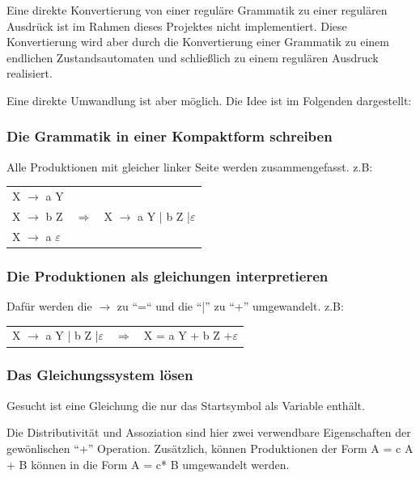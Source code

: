 Eine direkte Konvertierung von einer reguläre Grammatik zu einer regulären
Ausdrück ist im Rahmen dieses Projektes nicht implementiert. Diese Konvertierung
wird aber durch die Konvertierung einer Grammatik zu einem endlichen
Zustandsautomaten und schließlich zu einem regulären Ausdruck realisiert.

Eine direkte Umwandlung ist aber möglich. Die Idee ist im Folgenden dargestellt:
\subsubsection*{Die Grammatik in einer Kompaktform schreiben}
Alle Produktionen mit gleicher linker Seite werden zusammengefasst. z.B:

\begin{tabular}{lcr}

X $\rightarrow$ a Y & & \\
X $\rightarrow$ b Z & $\Longrightarrow$ & X $\rightarrow$ a Y | b Z
|$\varepsilon$\\
X $\rightarrow$ a $\varepsilon$ & &\\
 
\end{tabular}

\subsubsection*{Die Produktionen als gleichungen interpretieren}

Dafür werden die $\rightarrow$ zu ``=``  und die ``|'' zu ``+'' umgewandelt.
z.B:

\begin{tabular}{lcr}

X $\rightarrow$ a Y | b Z |$\varepsilon$ & $\Longrightarrow$ & X = a Y + b Z
+$\varepsilon$\\

 
\end{tabular}

\subsubsection*{Das Gleichungssystem lösen}

Gesucht ist eine Gleichung die nur das Startsymbol als Variable enthält.

Die Distributivität und Assoziation sind hier zwei verwendbare Eigenschaften der
gewönlischen ``+'' Operation. Zusätzlich, können Produktionen der Form A = c A +
B können in die Form A = c* B umgewandelt werden.


